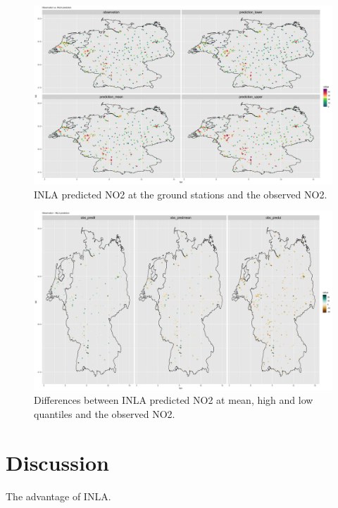 \documentclass{article}
\begin{document}
\begin{figure}
\centering
\includegraphics[scale = 0.05]{fig/pred_11var.png}
\caption{INLA predicted NO2 at the ground stations and the observed NO2. }
\label{INLApred}
\end{figure}

\begin{figure}
\centering
\includegraphics[scale = 0.05]{fig/dif_obs_INLA_11var.png}
\caption{Differences between INLA predicted NO2 at mean, high and low quantiles and the observed NO2. }
\label{difINLA}
\end{figure}

\section{Discussion}
The advantage of INLA.


\newpage



\end{document}
